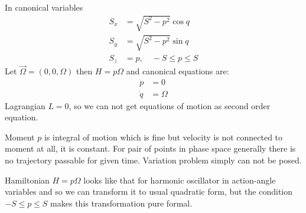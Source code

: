 In canonical variables 
\begin{equation}
   \label {sp3}
   \begin{split}
       S_x & = \sqrt{S^2-p^2} \cos q \\
       S_y & = \sqrt{S^2-p^2} \sin q \\
       S_z & = p,\quad -S\le p \le S
   \end{split}
\end{equation}
Let $ \vec \Omega =(0,0, \Omega) $ then $ H=p \Omega $ and canonical equations are:
\begin{equation}
   \label {sp4}
   \begin{split}
       \dot p & =0\\
       \dot q & = \Omega
   \end{split}
\end{equation}
Lagrangian $ L=0 $, so we can not get equations of motion as second order equation.

Moment $ p $ is integral of motion which is fine but velocity is not connected to 
moment at all, it is constant. For pair of points in phase space generally there is
no trajectory passable for given time. Variation problem simply can not be posed.

 Hamiltonian $ H=p \Omega $ looks like that for harmonic oscillator in action-angle variables
and so we can  transform it to usual quadratic form, but the condition $  -S\le p \le S$
makes this transformation pure formal.
